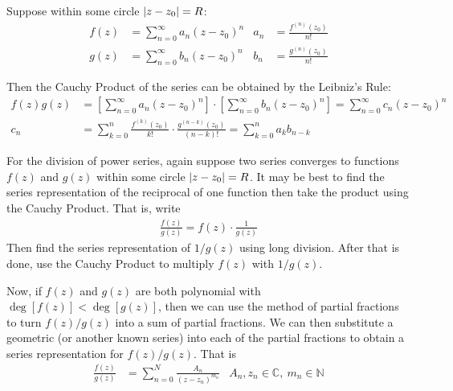 \documentclass[12pt, english]{book}
\begin{document}
	\begin{definition}
		\label{Cauchy Product Definition - Complex}
		Suppose within some circle \(\abs{z-z_0} = R\):
		\begin{align*}
			f(z) &= \sum_{n=0}^{\infty} a_n (z-z_0)^n & a_n &= \frac{f^{(n)}(z_0)}{n!} \\
			g(z) &= \sum_{n=0}^{\infty} b_n (z-z_0)^n & b_n &= \frac{g^{(n)}(z_0)}{n!}
		\end{align*}
		
		Then the Cauchy Product of the series can be obtained by the Leibniz's Rule:
		\begin{align*}
			f(z)g(z) 
			&= \left[\sum_{n=0}^{\infty} a_n (z-z_0)^n \right] \cdot \left[ \sum_{n=0}^{\infty} b_n (z-z_0)^n \right] = \sum_{n=0}^{\infty} c_n (z-z_0)^n \\
			c_n &= \sum_{k=0}^{n} \frac{f^{(k)}(z_0)}{k!} \cdot \frac{g^{(n-k)}(z_0)}{(n-k)!} = \sum_{k=0}^{n} a_k b_{n-k}
		\end{align*}
	\end{definition}
	
	For the division of power series, again suppose two series converges to functions \(f(z)\) and \(g(z)\) within some circle \(\abs{z-z_0}=R\). It may be best to find the series representation of the reciprocal of one function then take the product using the Cauchy Product. That is, write
	\begin{align*}
		\frac{f(z)}{g(z)} = f(z) \cdot \frac{1}{g(z)}
	\end{align*}
	Then find the series representation of \(1/g(z)\) using long division. After that is done, use the Cauchy Product to multiply \(f(z)\) with \(1/g(z)\).
	
	Now, if \(f(z)\) and \(g(z)\) are both polynomial with \(\deg[f(z)]<\deg[g(z)]\), then we can use the method of partial fractions to turn \(f(z)/g(z)\) into a sum of partial fractions. We can then substitute a geometric (or another known series) into each of the partial fractions to obtain a series representation for \(f(z)/g(z)\). That is 
	\begin{align*}
		\frac{f(z)}{g(z)} &= \sum_{n=0}^{N} \frac{A_n}{(z-z_n)^{m_n}} & A_n, z_n \in \mathbb{C}, \ m_n \in \mathbb{N}
	\end{align*}
	
\end{document}
